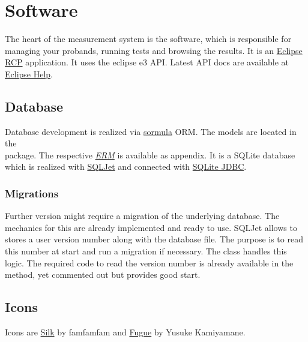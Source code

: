 \chapter{Software}
\label{source/software:arduino-java-interface}\label{source/software::doc}\label{source/software:software}
The heart of the measurement system is the software, which is responsible for managing your probands, running tests and browsing the results. It is an \href{http://eclipse.org/rcp}{Eclipse RCP} application. It uses the eclipse e3 API. Latest API docs are available at \href{http://help.eclipse.org}{Eclipse Help}.


\section{Database}
\label{source/software:eclipse-help}\label{source/software:database}
Database development is realized via \href{http://sormula.org}{sormula} ORM. 
The models are located in the \\  package. 
The respective {\hyperref[appendix/erm::doc]{\emph{\emph{ERM}}}} is available as appendix. It is a SQLite database which is realized with \href{http://sqljet.com}{SQLJet} and connected with \href{http://www.xerial.org/trac/Xerial/wiki/SQLiteJDBC}{SQLite JDBC}.


\subsection{Migrations}
\label{source/software:sqlite-jdbc}\label{source/software:migrations}
Further version might require a migration of the underlying database. The mechanics for this are already implemented and ready to use. SQLJet allows to stores a user version number along with the database file. The purpose is to read this number at start and run a migration if necessary. The class  handles this logic. The required code to read the version number is already available in the  method, yet commented out but provides good start.


\section{Icons}
\label{source/software:icons}
Icons are \href{http://www.famfamfam.com/lab/icons/silk/}{Silk} by famfamfam and \href{http://p.yusukekamiyamane.com}{Fugue} by Yusuke Kamiyamane.
\label{index:dev-docs}
